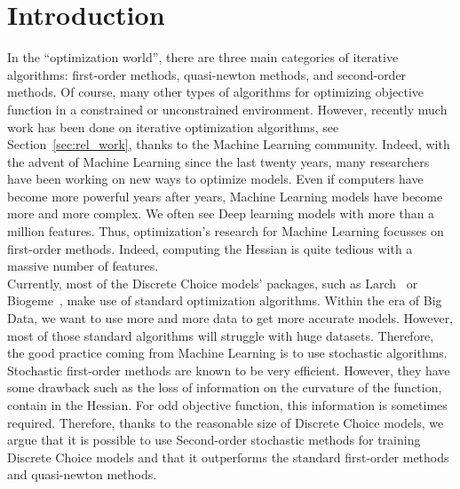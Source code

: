 \documentclass[conference]{IEEEtran}
\begin{document}
\section{Introduction}
\label{sec:intro}

In the ``optimization world'', there are three main categories of iterative algorithms: first-order methods, quasi-newton methods, and second-order methods. Of course, many other types of algorithms for optimizing objective function in a constrained or unconstrained environment. However, recently much work has been done on iterative optimization algorithms, see Section~\ref{sec:rel_work}, thanks to the Machine Learning community. Indeed, with the advent of Machine Learning since the last twenty years, many researchers have been working on new ways to optimize models. Even if computers have become more powerful years after years, Machine Learning models have become more and more complex. We often see Deep learning models with more than a million features. Thus, optimization's research for Machine Learning focusses on first-order methods. Indeed, computing the Hessian is quite tedious with a massive number of features. \\

Currently, most of the Discrete Choice models' packages, such as Larch~\cite{newman_larch:_2016} or Biogeme~\cite{bierlaire_biogeme:_2003}, make use of standard optimization algorithms. Within the era of Big Data, we want to use more and more data to get more accurate models. However, most of those standard algorithms will struggle with huge datasets. Therefore, the good practice coming from Machine Learning is to use stochastic algorithms. Stochastic first-order methods are known to be very efficient. However, they have some drawback such as the loss of information on the curvature of the function, contain in the Hessian. For odd objective function, this information is sometimes required. Therefore, thanks to the reasonable size of Discrete Choice models, we argue that it is possible to use Second-order stochastic methods for training Discrete Choice models and that it outperforms the standard first-order methods and quasi-newton methods. 

\end{document}

